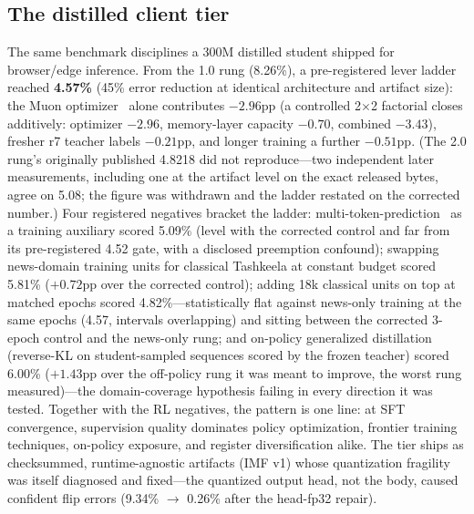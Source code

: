 \documentclass[11pt]{article}
\begin{document}
\subsection{The distilled client tier}
The same benchmark disciplines a 300M distilled student shipped for
browser/edge inference. From the 1.0 rung (8.26\%), a pre-registered
lever ladder reached \textbf{4.57\%} (45\% error reduction at
identical architecture and artifact size): the Muon optimizer~\cite{muon} alone
contributes $-2.96$pp (a controlled 2$\times$2 factorial closes
additively: optimizer $-2.96$, memory-layer capacity $-0.70$,
combined $-3.43$), fresher r7 teacher labels $-0.21$pp, and longer
training a further $-0.51$pp. (The 2.0 rung's originally published
4.8218 did not reproduce---two independent later measurements,
including one at the artifact level on the exact released bytes,
agree on 5.08; the figure was withdrawn and the ladder restated on
the corrected number.) Four registered negatives
bracket the ladder: multi-token-prediction~\cite{mtp} as a training auxiliary
scored 5.09\% (level with the corrected control and far from its
pre-registered 4.52 gate, with a disclosed preemption
confound); swapping news-domain training units for classical
Tashkeela at constant budget scored 5.81\% ($+0.72$pp over the
corrected control); adding 18k classical units on top at matched
epochs scored 4.82\%---statistically flat against news-only training
at the same epochs (4.57, intervals overlapping) and sitting between
the corrected 3-epoch control and the news-only rung; and
on-policy generalized distillation~\cite{gkd} (reverse-KL on student-sampled
sequences scored by the frozen teacher) scored 6.00\% ($+1.43$pp over
the off-policy rung it was meant to improve,
the worst rung measured)---the domain-coverage hypothesis failing
in every direction it was tested. Together with the RL negatives,
the pattern is one line: at SFT convergence, supervision quality
dominates policy optimization, frontier training techniques,
on-policy exposure, and register diversification alike. The
tier ships as checksummed, runtime-agnostic artifacts (IMF v1) whose
quantization fragility was itself diagnosed and fixed---the quantized
output head, not the body, caused confident flip errors (9.34\%
$\rightarrow$ 0.26\% after the head-fp32 repair).
\end{document}
